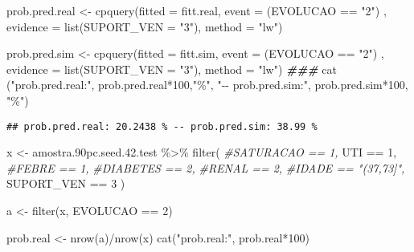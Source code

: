 \documentclass[
]{article}
\newenvironment{Shaded}{\begin{snugshade}}{\end{snugshade}}
\newcommand{\AttributeTok}[1]{\textcolor[rgb]{0.77,0.63,0.00}{#1}}
\newcommand{\CommentTok}[1]{\textcolor[rgb]{0.56,0.35,0.01}{\textit{#1}}}
\newcommand{\DecValTok}[1]{\textcolor[rgb]{0.00,0.00,0.81}{#1}}
\newcommand{\DocumentationTok}[1]{\textcolor[rgb]{0.56,0.35,0.01}{\textbf{\textit{#1}}}}
\newcommand{\FloatTok}[1]{\textcolor[rgb]{0.00,0.00,0.81}{#1}}
\newcommand{\FunctionTok}[1]{\textcolor[rgb]{0.00,0.00,0.00}{#1}}
\newcommand{\NormalTok}[1]{#1}
\newcommand{\OtherTok}[1]{\textcolor[rgb]{0.56,0.35,0.01}{#1}}
\newcommand{\SpecialCharTok}[1]{\textcolor[rgb]{0.00,0.00,0.00}{#1}}
\newcommand{\StringTok}[1]{\textcolor[rgb]{0.31,0.60,0.02}{#1}}
\begin{document}
\begin{Shaded}
\begin{Highlighting}[]
\NormalTok{prob.pred.real }\OtherTok{\textless{}{-}} \FunctionTok{cpquery}\NormalTok{(}\AttributeTok{fitted =}\NormalTok{ fitt.real, }
                    \AttributeTok{event =}\NormalTok{ (EVOLUCAO }\SpecialCharTok{==} \StringTok{"2"}\NormalTok{) , }
                    \AttributeTok{evidence =} \FunctionTok{list}\NormalTok{(}\AttributeTok{SUPORT\_VEN =} \StringTok{"3"}\NormalTok{), }
                    \AttributeTok{method =} \StringTok{"lw"}\NormalTok{)}

\NormalTok{prob.pred.sim }\OtherTok{\textless{}{-}} \FunctionTok{cpquery}\NormalTok{(}\AttributeTok{fitted =}\NormalTok{ fitt.sim, }
                    \AttributeTok{event =}\NormalTok{ (EVOLUCAO }\SpecialCharTok{==} \StringTok{"2"}\NormalTok{) , }
                    \AttributeTok{evidence =} \FunctionTok{list}\NormalTok{(}\AttributeTok{SUPORT\_VEN =} \StringTok{"3"}\NormalTok{), }
                    \AttributeTok{method =} \StringTok{"lw"}\NormalTok{)}
\DocumentationTok{\#\#\#}
\FunctionTok{cat}\NormalTok{ (}\StringTok{"prob.pred.real:"}\NormalTok{, prob.pred.real}\SpecialCharTok{*}\DecValTok{100}\NormalTok{,}\StringTok{"\%"}\NormalTok{, }\StringTok{"{-}{-} prob.pred.sim:"}\NormalTok{, prob.pred.sim}\SpecialCharTok{*}\DecValTok{100}\NormalTok{, }\StringTok{"\%"}\NormalTok{)}
\end{Highlighting}
\end{Shaded}

\begin{verbatim}
## prob.pred.real: 20.2438 % -- prob.pred.sim: 38.99 %
\end{verbatim}

\begin{Shaded}
\begin{Highlighting}[]
\NormalTok{x }\OtherTok{\textless{}{-}}\NormalTok{ amostra}\FloatTok{.90}\NormalTok{pc.seed.}\FloatTok{42.}\NormalTok{test }\SpecialCharTok{\%\textgreater{}\%} \FunctionTok{filter}\NormalTok{(}
                              \CommentTok{\#SATURACAO == 1, }
\NormalTok{                              UTI }\SpecialCharTok{==} \DecValTok{1}\NormalTok{, }
                              \CommentTok{\#FEBRE == 1, }
                              \CommentTok{\#DIABETES == 2, }
                              \CommentTok{\#RENAL == 2,}
                              \CommentTok{\#IDADE == "(37,73]",}
\NormalTok{                              SUPORT\_VEN }\SpecialCharTok{==} \DecValTok{3}
\NormalTok{                            )}

\NormalTok{a }\OtherTok{\textless{}{-}} \FunctionTok{filter}\NormalTok{(x, EVOLUCAO }\SpecialCharTok{==} \DecValTok{2}\NormalTok{)}


\NormalTok{prob.real }\OtherTok{\textless{}{-}} \FunctionTok{nrow}\NormalTok{(a)}\SpecialCharTok{/}\FunctionTok{nrow}\NormalTok{(x)}
\FunctionTok{cat}\NormalTok{(}\StringTok{"prob.real:"}\NormalTok{, prob.real}\SpecialCharTok{*}\DecValTok{100}\NormalTok{)}
\end{Highlighting}
\end{Shaded}
\end{document}
